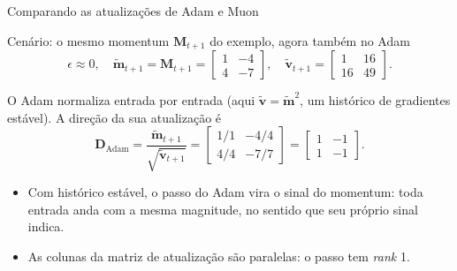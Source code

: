 \documentclass[aspectratio=169,xcolor=dvipsnames]{beamer}
\begin{document}
  \begin{frame}{Comparando as atualizações de Adam e Muon}
    \begin{block}{Cenário: o mesmo momentum $\mathbf{M}_{t+1}$ do exemplo, agora também no Adam}
      \[
        \epsilon\approx 0,\quad
        \widetilde{\mathbf{m}}_{t+1}=\mathbf{M}_{t+1}=\begin{bmatrix}1&-4\\4&-7\end{bmatrix},\quad
        \widetilde{\mathbf{v}}_{t+1}=\begin{bmatrix}1&16\\16&49\end{bmatrix}.
      \]
    \end{block}
    O Adam normaliza entrada por entrada (aqui $\widetilde{\mathbf{v}}=\widetilde{\mathbf{m}}^{2}$, um histórico de gradientes estável). A direção da sua atualização é
    \[
      \mathbf{D}_{\text{Adam}}=\frac{\widetilde{\mathbf{m}}_{t+1}}{\sqrt{\widetilde{\mathbf{v}}_{t+1}}}
      =\begin{bmatrix}1/1&-4/4\\4/4&-7/7\end{bmatrix}
      =\begin{bmatrix}1&-1\\1&-1\end{bmatrix}.
    \]
    \begin{itemize}
      \item Com histórico estável, o passo do Adam vira o \alert{sinal} do momentum: toda entrada anda com a mesma magnitude, no sentido que seu próprio sinal indica.
      \item As colunas da matriz de atualização são paralelas: o passo tem \textit{rank} 1.
    \end{itemize}
  \end{frame}
\end{document}
